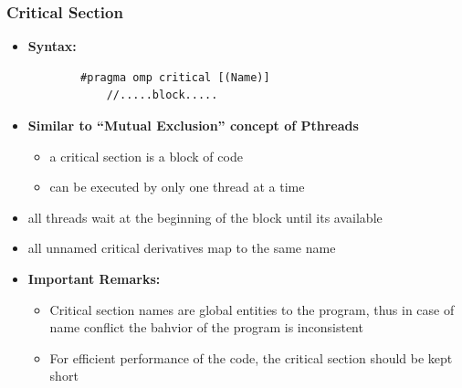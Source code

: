\documentclass[12pt, a4paper]{report}
\begin{document}
\subsubsection{Critical Section}
\begin{itemize}
    \item {\bfseries{Syntax:}} 
    \begin{verbatim}
        #pragma omp critical [(Name)]
            //.....block.....
    \end{verbatim}
    \item {\bfseries{Similar to ``Mutual Exclusion'' concept of Pthreads}}
    \begin{itemize}
        \item a critical section is a block of code
        \item can be executed by only one thread at a time
    \end{itemize}
    \item all threads wait at the beginning of the block until its available
    \item all unnamed critical derivatives map to the same name
    \item {\bfseries{Important Remarks:}}
    \begin{itemize}
        \item Critical section names are global entities to the program, thus in case of name conflict the bahvior of the program is inconsistent
        \item For efficient performance of the code, the critical section should be kept short
    \end{itemize}
\end{itemize}
\end{document}
